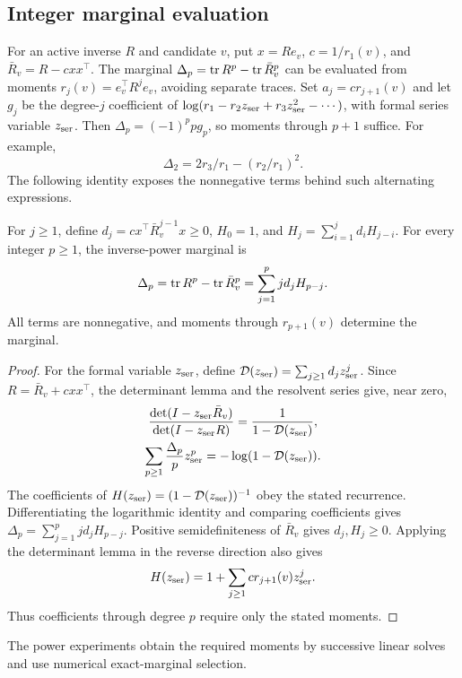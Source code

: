 \subsection{Integer marginal evaluation}
For an active inverse $R$ and candidate $v$, put $x=Re_v$,
$c=1/r_1(v)$, and $\bar R_v=R-cxx^\top$. The marginal
$\Delta_p=\operatorname{tr} R^p-\operatorname{tr} \bar R_v^p$ can be evaluated from moments
$r_j(v)=e_v^\top R^je_v$, avoiding separate traces.
Set $a_j=cr_{j+1}(v)$ and let $g_j$ be the degree-$j$
coefficient of $\log(r_1-r_2z_{\rm ser}+r_3z_{\rm ser}^2-\cdots)$, with formal
series variable $z_{\rm ser}$. Then $\Delta_p=(-1)^ppg_p$, so moments
through $p+1$ suffice. For example,
\begin{equation}\label{eq:p2}
 \Delta_2=2r_3/r_1-(r_2/r_1)^2.
\end{equation}
The following identity exposes the nonnegative terms behind
such alternating expressions.

\begin{proposition}\label{main:integer}
For $j\geq1$, define $d_j=cx^\top\bar R_v^{j-1}x\geq0$,
$H_0=1$, and $H_j=\sum_{i=1}^j d_iH_{j-i}$.
For every integer $p\geq1$, the inverse-power marginal is
\[
 \Delta_p=\operatorname{tr} R^p-\operatorname{tr}\bar R_v^p=\sum_{j=1}^p j d_jH_{p-j}.
\]
All terms are nonnegative, and moments through $r_{p+1}(v)$
determine the marginal.
\end{proposition}
\begin{proof}
For the formal variable $z_{\rm ser}$, define
$\mathcal D(z_{\rm ser})=\sum_{j\geq1}d_jz_{\rm ser}^j$.
Since $R=\bar R_v+cxx^\top$, the determinant lemma and the
resolvent series give, near zero,
\begin{gather*}
 \frac{\det(I-z_{\rm ser}\bar R_v)}{\det(I-z_{\rm ser}R)}
       =\frac1{1-\mathcal D(z_{\rm ser})},\\
 \sum_{p\geq1}\frac{\Delta_p}{p}z_{\rm ser}^p
       =-\log(1-\mathcal D(z_{\rm ser})).
\end{gather*}
The coefficients of
$H(z_{\rm ser})=(1-\mathcal D(z_{\rm ser}))^{-1}$ obey the
stated recurrence. Differentiating the logarithmic identity and
comparing coefficients gives $\Delta_p=\sum_{j=1}^p j d_jH_{p-j}$.
Positive semidefiniteness of $\bar R_v$ gives $d_j,H_j\geq0$.
Applying the determinant lemma in the reverse direction also gives
\[
 H(z_{\rm ser})=1+\sum_{j\geq1}cr_{j+1}(v)z_{\rm ser}^j.
\]
Thus coefficients through degree $p$ require only the stated moments.
\end{proof}

The power experiments obtain the required moments by successive
linear solves and use numerical exact-marginal selection.

